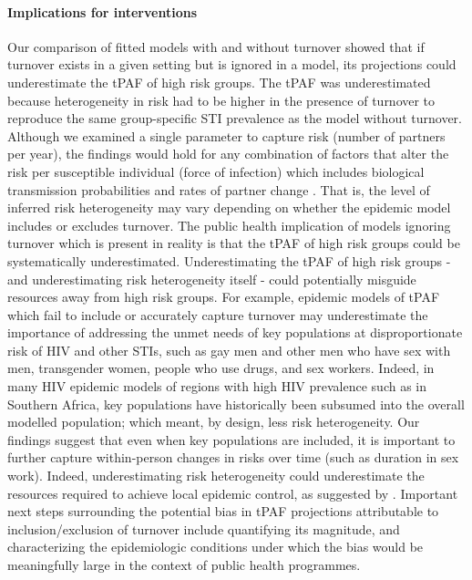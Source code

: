 \paragraph{Implications for interventions}
Our comparison of fitted models with and without turnover
showed that if turnover exists in a given setting
but is ignored in a model, its projections could 
underestimate 
the tPAF of high risk groups.		
The tPAF was underestimated because heterogeneity in risk
had to be higher in the presence of turnover
to reproduce the same group-specific STI prevalence as the model without turnover.
Although we examined a single parameter to capture risk
(number of partners per year),
the findings would hold for any combination of factors
that alter the risk per susceptible individual (force of infection)  
which includes
biological transmission probabilities and rates of partner change \citep{Anderson1991}.
That is, the level of inferred risk heterogeneity may vary depending on whether
the epidemic model includes or excludes turnover.
The public health implication of models ignoring turnover
which is present in reality is that
the tPAF of high risk groups could be systematically underestimated.
Underestimating the tPAF of high risk groups - and underestimating
risk heterogeneity itself - could potentially misguide resources away from high risk groups.
For example, epidemic models of tPAF which fail to include or accurately capture 
turnover may underestimate the importance of addressing the unmet 
needs of key populations at disproportionate risk of HIV and other STIs, such as
gay men and other men who have sex with men,
transgender women,
people who use drugs, and
sex workers.
Indeed, in many HIV epidemic models of regions with high HIV prevalence such as in Southern Africa,
key populations have historically been subsumed into the overall modelled population; which meant, by design,
less risk heterogeneity. %
Our findings suggest that even when key populations are included, it is important to 
further capture within-person changes in risks over time (such as duration in sex work). 
Indeed, underestimating risk heterogeneity could underestimate the resources 
required to achieve local epidemic control, as suggested by \citet{Henry2015}. %
Important next steps surrounding the potential bias in tPAF projections attributable to inclusion/exclusion
of turnover include quantifying its magnitude, 
and characterizing the epidemiologic conditions under which the bias
would be meaningfully large in the context of public health programmes.

